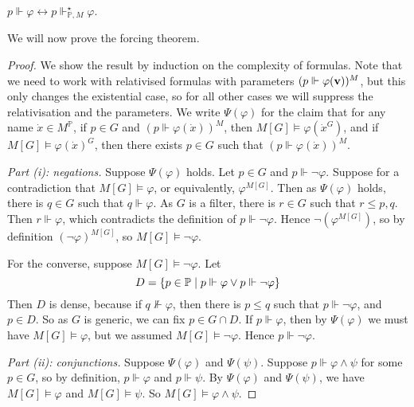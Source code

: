 \begin{corollary}
    \( p \Vdash \varphi \leftrightarrow p \Vdash^\star_{\mathbb P, M} \varphi \).
\end{corollary}
We will now prove the forcing theorem.
\begin{proof}
    We show the result by induction on the complexity of formulas.
    Note that we need to work with relativised formulas with parameters \( (p \Vdash \varphi(\vb v))^M \), but this only changes the existential case, so for all other cases we will suppress the relativisation and the parameters.
    We write \( \Psi(\varphi) \) for the claim that for any name \( \dot x \in M^{\mathbb P} \), if \( p \in G \) and \( (p \Vdash \varphi(\dot x))^M \), then \( M[G] \vDash \varphi(\dot x^G) \), and if \( M[G] \vDash \varphi(\dot x)^G \), then there exists \( p \in G \) such that \( (p \Vdash \varphi(\dot x))^M \).

    \emph{Part (i): negations.}
    Suppose \( \Psi(\varphi) \) holds.
    Let \( p \in G \) and \( p \Vdash \neg \varphi \).
    Suppose for a contradiction that \( M[G] \vDash \varphi \), or equivalently, \( \varphi^{M[G]} \).
    Then as \( \Psi(\varphi) \) holds, there is \( q \in G \) such that \( q \Vdash \varphi \).
    As \( G \) is a filter, there is \( r \in G \) such that \( r \leq p, q \).
    Then \( r \Vdash \varphi \), which contradicts the definition of \( p \Vdash \neg\varphi \).
    Hence \( \neg(\varphi^{M[G]}) \), so by definition \( (\neg \varphi)^{M[G]} \), so \( M[G] \vDash \neg\varphi \).

    For the converse, suppose \( M[G] \vDash \neg\varphi \).
    Let
    \[ D = \qty{p \in \mathbb P \mid p \Vdash \varphi \vee p \Vdash \neg\varphi} \]
    Then \( D \) is dense, because if \( q \nVdash \varphi \), then there is \( p \leq q \) such that \( p \Vdash \neg\varphi \), and \( p \in D \).
    So as \( G \) is generic, we can fix \( p \in G \cap D \).
    If \( p \Vdash \varphi \), then by \( \Psi(\varphi) \) we must have \( M[G] \vDash \varphi \), but we assumed \( M[G] \vDash \neg\varphi \).
    Hence \( p \Vdash \neg\varphi \).

    \emph{Part (ii): conjunctions.}
    Suppose \( \Psi(\varphi) \) and \( \Psi(\psi) \).
    Suppose \( p \Vdash \varphi \wedge \psi \) for some \( p \in G \), so by definition, \( p \Vdash \varphi \) and \( p \Vdash \psi \).
    By \( \Psi(\varphi) \) and \( \Psi(\psi) \), we have \( M[G] \vDash \varphi \) and \( M[G] \vDash \psi \).
    So \( M[G] \vDash \varphi \wedge \psi \).


\end{proof}
